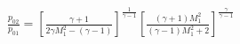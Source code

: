 \documentclass[10pt]{article}
\begin{document}
\begin{align*}\frac{p_{02}}{p_{01}}
=
\left[
\frac{\gamma + 1}{2 \gamma M_{1}^{2} - \left( \gamma -1 \right) }
\right]^{\frac{1}{\gamma-1} }
\left[ 
\frac{ \left( \gamma + 1 \right) M_{1}^{2} }{ \left( \gamma -1 \right) M_{1}^{2} + 2 }
\right]^{\frac{\gamma}{\gamma-1}}\end{align*}
\end{document}
